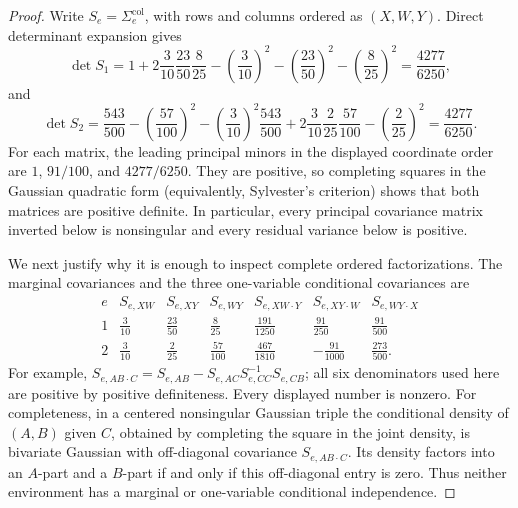 \documentclass{article}
\begin{document}
\begin{proof}
Write \(S_e=\Sigma^{\mathrm{col}}_e\), with rows and columns ordered as \((X,W,Y)\). Direct determinant expansion gives
\[
 \det S_1
 =1+2\frac{3}{10}\frac{23}{50}\frac{8}{25}
   -\left(\frac{3}{10}\right)^2
   -\left(\frac{23}{50}\right)^2
   -\left(\frac{8}{25}\right)^2
 =\frac{4277}{6250},
\]
and
\[
 \det S_2
 =\frac{543}{500}
   -\left(\frac{57}{100}\right)^2
   -\left(\frac{3}{10}\right)^2\frac{543}{500}
   +2\frac{3}{10}\frac{2}{25}\frac{57}{100}
   -\left(\frac{2}{25}\right)^2
 =\frac{4277}{6250}.
\]
For each matrix, the leading principal minors in the displayed coordinate order are \(1\), \(91/100\), and \(4277/6250\). They are positive, so completing squares in the Gaussian quadratic form (equivalently, Sylvester's criterion) shows that both matrices are positive definite. In particular, every principal covariance matrix inverted below is nonsingular and every residual variance below is positive.

We next justify why it is enough to inspect complete ordered factorizations. The marginal covariances and the three one-variable conditional covariances are
\[
\begin{array}{c|ccc|ccc}
 e& S_{e,XW}&S_{e,XY}&S_{e,WY}
  &S_{e,XW\cdot Y}&S_{e,XY\cdot W}&S_{e,WY\cdot X}\\ \hline
 1&\frac3{10}&\frac{23}{50}&\frac8{25}
  &\frac{191}{1250}&\frac{91}{250}&\frac{91}{500}\\[2pt]
 2&\frac3{10}&\frac2{25}&\frac{57}{100}
  &\frac{467}{1810}&-\frac{91}{1000}&\frac{273}{500}.
\end{array}
\]
For example, \(S_{e,AB\cdot C}=S_{e,AB}-S_{e,AC}S_{e,CC}^{-1}S_{e,CB}\); all six denominators used here are positive by positive definiteness. Every displayed number is nonzero. For completeness, in a centered nonsingular Gaussian triple the conditional density of \((A,B)\) given \(C\), obtained by completing the square in the joint density, is bivariate Gaussian with off-diagonal covariance \(S_{e,AB\cdot C}\). Its density factors into an \(A\)-part and a \(B\)-part if and only if this off-diagonal entry is zero. Thus neither environment has a marginal or one-variable conditional independence.


\end{proof}
\end{document}

